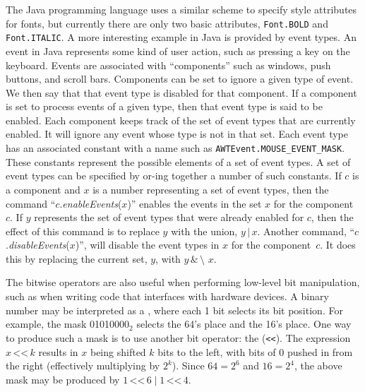The Java programming language uses a similar scheme to specify style
attributes for fonts, but currently there are only two basic
attributes, \texttt{Font.BOLD} and \texttt{Font.ITALIC}.  A more
interesting example in Java is provided by event types.  An event in 
Java represents some kind of user action, such as pressing a key on the
keyboard.  Events are associated with ``components'' such as windows,
push buttons, and scroll bars.  Components can be set to ignore
a given type of event.  We then say that that event type is disabled
for that component.  If a component is set to process events of
a given type, then that event type is said to be enabled.  Each
component keeps track of the set of event types that are currently
enabled.  It will ignore any event whose type is not in that set.
Each event type has an associated constant with a name such
as \texttt{AWTEvent.MOUSE\_EVENT\_MASK}.  These constants represent
the possible elements of a set of event types.  A set of event types can be
specified by or-ing together a number of such constants.  If
$c$ is a component and $x$ is a number representing a set of event
types, then the command ``$c$.\textit{enableEvents}($x$)'' enables the
events in the set $x$ for the component~$c$.  If $y$ represents
the set of event types that were already enabled for $c$, then the effect
of this command is to replace $y$ with the union, $y\,|\,x$.  Another
command, ``$c$.\textit{disableEvents}($x$)'', will disable the
event types in $x$ for the component~$c$.  It does this by replacing
the current set, $y$, with $y\,\&\,\texttt{\char`\~}x$.

The bitwise operators are also useful when performing low-level bit manipulation,
such as when writing code that interfaces with hardware devices. A binary number
may be interpreted as a , where each 1 bit selects its bit
position. For example, the mask 01010000$_2$ selects the 64's place and the
16's place. One way to produce such a mask is to use another bit operator: the
 (\verb|<<|). The expression $x\,\texttt{<<}\,k$ results in $x$ being
shifted $k$ bits to the left, with bits of 0 pushed in from the right
(effectively multiplying by $2^k$). Since $64=2^6$ and $16=2^4$, the above mask
may be produced by $1\,\texttt{<<}\,6\;|\;1\,\texttt{<<}\,4$.

